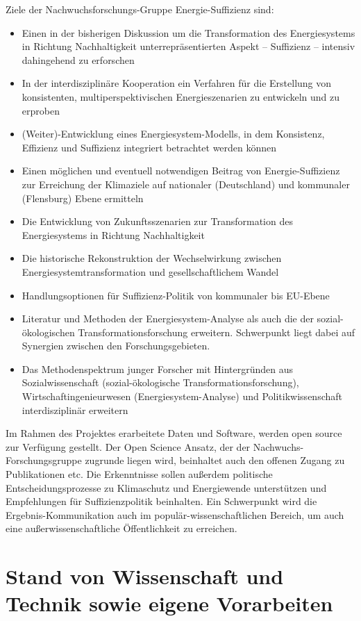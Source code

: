\documentclass[a4paper,11pt,twoside]{scrartcl}
\begin{document}
Ziele der Nachwuchsforschungs-Gruppe Energie-Suffizienz sind:
\begin{itemize}
 \item Einen in der bisherigen Diskussion um die Transformation des Energiesystems in Richtung Nachhaltigkeit unterrepräsentierten Aspekt  -- Suffizienz -- intensiv dahingehend zu erforschen
  \item In der interdisziplinäre Kooperation ein Verfahren für die Erstellung von konsistenten, multiperspektivischen  Energieszenarien zu entwickeln und zu erproben
  \item (Weiter)-Entwicklung eines Energiesystem-Modells, in dem Konsistenz, Effizienz und Suffizienz integriert betrachtet werden können
 \item Einen möglichen und eventuell notwendigen Beitrag von Energie-Suffizienz zur Erreichung der Klimaziele auf nationaler (Deutschland) und kommunaler (Flensburg) Ebene ermitteln
 \item Die Entwicklung von Zukunftsszenarien zur Transformation des Energiesystems in Richtung Nachhaltigkeit 
 \item Die historische Rekonstruktion der Wechselwirkung zwischen Energiesystemtransformation und gesellschaftlichem Wandel  
 \item Handlungsoptionen für Suffizienz-Politik von kommunaler bis EU-Ebene
 \item Literatur und Methoden der Energiesystem-Analyse als auch die der sozial-ökologischen Transformationsforschung erweitern. Schwerpunkt liegt dabei auf Synergien zwischen den Forschungsgebieten.
 \item Das Methodenspektrum junger Forscher mit Hintergründen aus Sozialwissenschaft (sozial-ökologische Transformationsforschung), Wirtschaftingenieurwesen (Energiesystem-Analyse) und Politikwissenschaft interdisziplinär erweitern
\end{itemize}

Im Rahmen des Projektes erarbeitete Daten und Software, werden open source zur Verfügung gestellt. Der Open Science Ansatz, der der Nachwuchs-Forschungsgruppe zugrunde liegen wird, beinhaltet auch den offenen Zugang zu Publikationen etc. Die Erkenntnisse sollen außerdem politische Entscheidungsprozesse zu Klimaschutz und Energiewende unterstützen und Empfehlungen für Suffizienzpolitik beinhalten. Ein Schwerpunkt wird die Ergebnis-Kommunikation auch im populär-wissenschaftlichen Bereich, um auch eine außerwissenschaftliche Öffentlichkeit zu erreichen.

\section{Stand von Wissenschaft und Technik sowie eigene Vorarbeiten}
\end{document}
